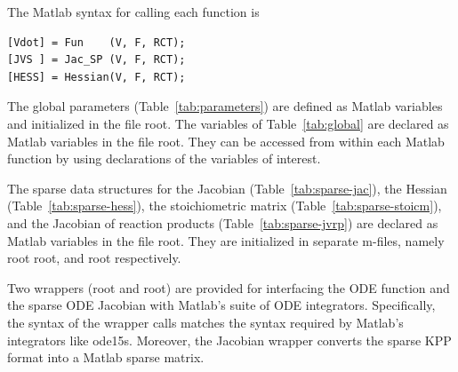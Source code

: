 \documentclass[twoside]{article}
\newcommand{\kpproot}{{\sc root}}
\begin{document}
The Matlab syntax for calling each function is
%
\begin{verbatim}
[Vdot] = Fun    (V, F, RCT);
[JVS ] = Jac_SP (V, F, RCT);
[HESS] = Hessian(V, F, RCT);
\end{verbatim}
%
The global parameters (Table~\ref{tab:parameters}) are defined as Matlab
 variables and initialized in the file
\kpproot{}. The variables of
Table~\ref{tab:global} are declared as Matlab  variables in
the file \kpproot{}. They can be accessed from within
each Matlab function by using  declarations of the
variables of interest.

The sparse data structures for the Jacobian
(Table~\ref{tab:sparse-jac}), the Hessian (Table~\ref{tab:sparse-hess}),
the stoichiometric matrix (Table~\ref{tab:sparse-stoicm}), and the
Jacobian of reaction products (Table~\ref{tab:sparse-jvrp}) are declared
as Matlab  variables in the file
\kpproot{}. They are initialized in separate m-files,
namely \kpproot{} \kpproot{}, and
\kpproot{} respectively.

Two wrappers (\kpproot{} and
\kpproot{}) are provided for interfacing the ODE
function and the sparse ODE Jacobian with Matlab's suite of ODE
integrators. Specifically, the syntax of the wrapper calls matches the
syntax required by Matlab's integrators like ode15s. Moreover, the
Jacobian wrapper converts the sparse KPP format into a Matlab sparse
matrix.
\end{document}
